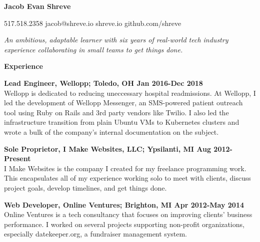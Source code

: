 \documentclass[10pt,letter]{article}
\begin{document}
\hspace*{-1.1in}

\vspace*{-0.25in}
\textbf{\Huge Jacob Evan Shreve}

\vspace{0.25in}

{517.518.2358 \hspace{0.3in} jacob@shreve.io \hspace{0.3in} shreve.io \hspace{0.3in} github.com/shreve}
\vspace{0.25in}

\textit{\large{
An ambitious, adaptable learner with six years of real-world tech industry experience
collaborating in small teams to get things done.
}}
\vspace{0.25in}

\vspace{0.15in}
{\Large\textbf{Experience}}
\vspace{0.15in}

\textbf{Lead Engineer, Wellopp; Toledo, OH \hfill Jan 2016-Dec 2018}\\
Wellopp is dedicated to reducing uneccessary hospital readmissions. At Wellopp, I led
the development of Wellopp Messenger, an SMS-powered patient outreach tool using Ruby on Rails
and 3rd party vendors like Twilio. I also led the infrastructure transition from plain Ubuntu VMs to Kubernetes clusters and wrote a bulk of the company's internal documentation on the subject.
\vspace{0.25in}

\textbf{Sole Proprietor, I Make Websites, LLC; Ypsilanti, MI \hfill Aug 2012-Present}\\
I Make Websites is the company I created for my freelance programming work. This
encapsulates all of my experience working solo to meet with clients, discuss project goals,
develop timelines, and get things done.
\vspace{0.25in}

\textbf{Web Developer, Online Ventures; Brighton, MI \hfill Apr 2012-May 2014}\\
Online Ventures is a tech consultancy that focuses on improving clients’ business performance.
I worked on several projects supporting non-profit organizations,
especially datekeeper.org, a fundraiser management system.
\vspace{0.25in}
\end{document}
